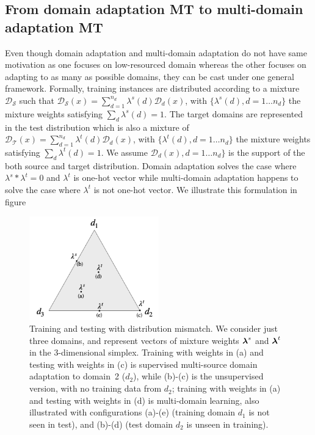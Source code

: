 \subsection{From domain adaptation MT to multi-domain adaptation MT}
Even though domain adaptation and multi-domain adaptation do not have same motivation as one focuses on low-resourced domain whereas the other focuses on adapting to as many as possible domains, they can be cast under one general framework. Formally, training instances are distributed according to a mixture $\mathcal{D_S}$ such that $\mathcal{D_S}(x) = \sum_{d=1}^{n_d} \lambda^{s}(d) \mathcal{D}_d(x)$, with $\{\lambda^{s}(d), d=1 \dots n_d\}$ the mixture weights satisfying $\sum_d \lambda^{s}(d)=1$. The target domains are represented in the test distribution which is also a mixture of $\mathcal{D_T}(x) = \sum_{d=1}^{n_d} \lambda^{t}(d) \mathcal{D}_d(x)$, with $\{\lambda^{t}(d), d=1 \dots n_d\}$ the mixture weights satisfying $\sum_d \lambda^{t}(d)=1$. We assume $\mathcal{D}_d(x), d=1 \dots n_d\}$ is the support of the both source and target distribution. Domain adaptation solves the case where $\lambda^s * \lambda^t = 0$ and $\lambda^t$ is one-hot vector while multi-domain adaptation happens to solve the case where $\lambda^t$ is not one-hot vector. We illustrate this formulation in figure %
\begin{figure}[h]
  \centering
  \includegraphics[width=0.5\textwidth]{graphics/mdmt-lambdas}
  \caption{Training and testing with distribution mismatch. We consider just three domains, and represent vectors of mixture weights $\boldsymbol\lambda^{s}$ and $\boldsymbol\lambda^{t}$ in the 3-dimensional simplex. Training with weights in (a) and testing with weights in (c) is supervised multi-source domain adaptation to domain~2 ($d_2$), while (b)-(c) is the unsupervised version, with no training data from $d_2$; training with weights in (a) and testing with weights in (d) is multi-domain learning, also illustrated with configurations (a)-(e) (training domain $d_1$ is not seen in test), and (b)-(d)  (test domain $d_2$ is unseen in training).}
  \label{fig:mdmt-lambdas}
\end{figure}

